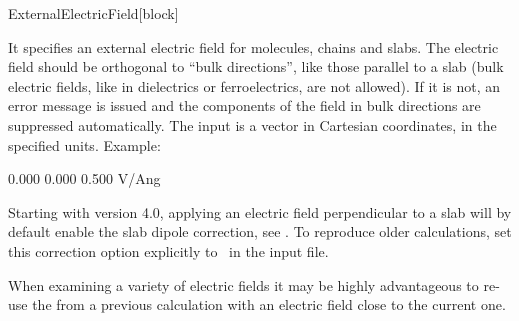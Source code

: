   \begin{fdfentry}{ExternalElectricField}[block]
  
    It specifies an external electric field for molecules, chains and
    slabs. The electric field should be orthogonal to ``bulk
    directions'', like those parallel to a slab (bulk electric fields,
    like in dielectrics or ferroelectrics, are not allowed). If it is
    not, an error message is issued and the components of the field in
    bulk directions are suppressed automatically. The input is a vector
    in Cartesian coordinates, in the specified units. Example:
    \begin{fdfexample}
          0.000  0.000  0.500  V/Ang
    \end{fdfexample}
  
    Starting with version 4.0, applying an electric field perpendicular
    to a slab will by default enable the slab dipole correction, see
    . To reproduce older calculations, set
    this correction option explicitly to \fdffalse\ in the input file.
  
    When examining a variety of electric fields it may be highly
    advantageous to re-use the  from a previous calculation
    with an electric field close to the current one.
  
  \end{fdfentry}
  
